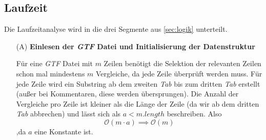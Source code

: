 \documentclass[12pt]{article}
\begin{document}
\subsection{Laufzeit}
Die Laufzeitanalyse wird in die drei Segmente aus \ref{sec:logik} unterteilt.
\begin{enumerate}
	\item[(A)] \textbf{Einlesen der \textit{GTF} Datei und Initialisierung der Datenstruktur}

		Für eine \textit{GTF} Datei mit $m$ Zeilen benötigt die Selektion der relevanten Zeilen
		schon mal mindestens $m$ Vergleiche, da jede Zeile überprüft werden muss.
		Für jede Zeile wird ein Substring ab dem zweiten \textit{Tab} bis zum dritten \textit{Tab} erstellt (au\ss er bei Kommentaren, diese werden übersprungen).
		Die Anzahl der Vergleiche pro Zeile ist kleiner als die Länge der Zeile (da wir ab dem dritten \textit{Tab} abbrechen) und lässt
		sich als $a < m.length$ beschreiben. Also
		\begin{equation}
			\mathcal{O}(m \cdot a) \implies \mathcal{O}(m)
		\end{equation}
		,da $a$ eine Konstante ist.


\end{enumerate}
\end{document}
